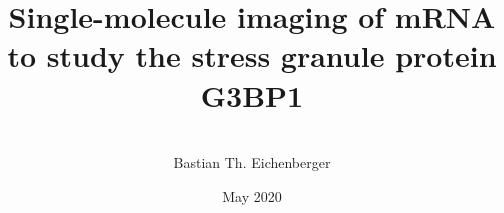 \documentclass{masterthesis}
\title{Single-molecule imaging of mRNA to study the stress granule protein G3BP1}
\author{\\Bastian Th. Eichenberger}
\date{May 2020}
\begin{document}
\maketitle
\makefrontmatter






\clearpage
\makebibliography

\begin{appendices}


\end{appendices}
\end{document}

